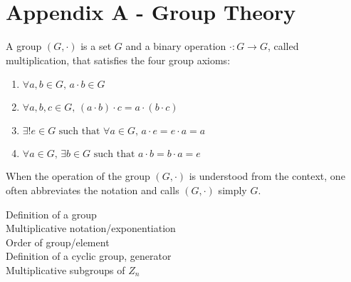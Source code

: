 \section{Appendix A - Group Theory}

A group $(G, \cdot)$ is a set $G$ and a binary operation $\cdot: G \to G$, called
multiplication, that satisfies the four group axioms:
\begin{enumerate}
\item $\forall a,b \in G, \, a\cdot b \in G$
\item $\forall a,b,c \in G, \, (a\cdot b)\cdot c = a \cdot (b \cdot c)$ 
\item $\exists! e \in G \text{ such that } \forall a \in G, \, a \cdot e = e \cdot a = a$
\item $\forall a \in G, \, \exists b \in G \text{ such that } a \cdot b = b \cdot a = e$
\end{enumerate}

When the operation of the group $(G, \cdot)$ is understood from the
context, one often abbreviates the notation and calls $(G, \cdot)$
simply $G$.


 Definition of a group\\ Multiplicative
notation/exponentiation\\ Order of group/element\\ Definition of a
cyclic group, generator\\ Multiplicative subgroups of $Z_n$
